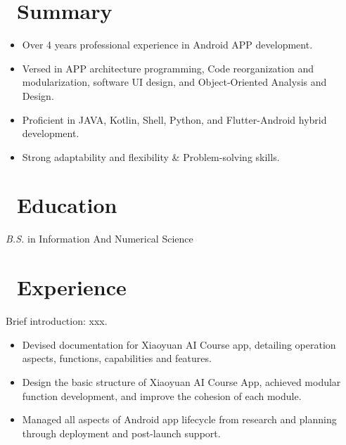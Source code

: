 \documentclass{resume}
\begin{document}



\section{\faUserCircle\ Summary}
\begin{itemize}[parsep=0.5ex]
  \item Over 4 years professional experience in Android APP development.
  \item Versed in APP architecture programming, Code reorganization and modularization,
  software UI design, and Object-Oriented Analysis and Design.
  \item Proficient in JAVA, Kotlin, Shell, Python, and Flutter-Android hybrid development.
  \item Strong adaptability and flexibility \& Problem-solving skills.
\end{itemize}

\section{\faGraduationCap\ Education}
\textit{B.S.} in Information And Numerical Science

\section{\faUsers\ Experience}
Brief introduction: xxx.
\begin{itemize}
  \item Devised documentation for Xiaoyuan AI Course app, detailing operation aspects, functions, capabilities and features.
  \item Design the basic structure of Xiaoyuan AI Course App, achieved modular function development, and improve the cohesion of each module.
  \item Managed all aspects of Android app lifecycle from research and planning through deployment and post-launch support.
\end{itemize}
\end{document}
